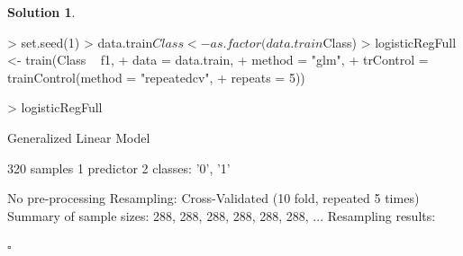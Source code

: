 \documentclass[twoside]{article}
\theoremstyle{definition}
\newtheorem*{solutionT}{Solution}
\newenvironment{solution}{\begin{cBox}\begin{solutionT}}{\hfill{\scriptsize\ensuremath{\square}}\end{solutionT}\end{cBox}}
\theoremstyle{definition}
\begin{document}
\begin{enumerate}
\begin{solution}
\begin{Schunk}
\begin{Sinput}
> set.seed(1)
> data.train$Class <- as.factor(data.train$Class)
> logisticRegFull <- train(Class ~ f1,
+                      data = data.train,
+                      method = "glm",
+                      trControl = trainControl(method = "repeatedcv", 
+                                               repeats = 5))
\end{Sinput}
\end{Schunk}

\begin{Schunk}
\begin{Sinput}
> logisticRegFull
\end{Sinput}
\begin{Soutput}
Generalized Linear Model 

320 samples
  1 predictor
  2 classes: '0', '1' 

No pre-processing
Resampling: Cross-Validated (10 fold, repeated 5 times) 
Summary of sample sizes: 288, 288, 288, 288, 288, 288, ... 
Resampling results:


\end{Soutput}
\end{Schunk}
\end{solution}
\end{enumerate}
\end{document}
